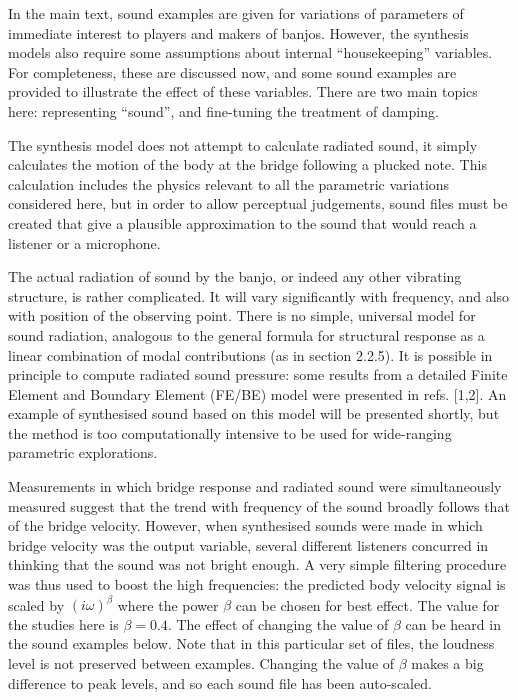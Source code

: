   In the main text, sound examples are given for variations of parameters of 
  immediate interest to players and makers of banjos. However, the synthesis 
  models also require some assumptions about internal ``housekeeping'' 
  variables. For completeness, these are discussed now, and some sound examples 
  are provided to illustrate the effect of these variables. There are two main 
  topics here: representing ``sound'', and fine-tuning the treatment of 
  damping. 

  The synthesis model does not attempt to calculate radiated sound, it simply 
  calculates the motion of the body at the bridge following a plucked note. 
  This calculation includes the physics relevant to all the parametric 
  variations considered here, but in order to allow perceptual judgements, 
  sound files must be created that give a plausible approximation to the sound 
  that would reach a listener or a microphone. 

  The actual radiation of sound by the banjo, or indeed any other vibrating 
  structure, is rather complicated. It will vary significantly with frequency, 
  and also with position of the observing point. There is no simple, universal 
  model for sound radiation, analogous to the general formula for structural 
  response as a linear combination of modal contributions (as in section 
  2.2.5). It is possible in principle to compute radiated sound pressure: some 
  results from a detailed Finite Element and Boundary Element (FE/BE) model 
  were presented in refs. [1,2]. An example of synthesised sound based on this 
  model will be presented shortly, but the method is too computationally 
  intensive to be used for wide-ranging parametric explorations. 

  Measurements in which bridge response and radiated sound were simultaneously 
  measured suggest that the trend with frequency of the sound broadly follows 
  that of the bridge velocity. However, when synthesised sounds were made in 
  which bridge velocity was the output variable, several different listeners 
  concurred in thinking that the sound was not bright enough. A very simple 
  filtering procedure was thus used to boost the high frequencies: the 
  predicted body velocity signal is scaled by $(i \omega)^\beta$ where the 
  power $\beta$ can be chosen for best effect. The value for the studies here 
  is $\beta=0.4$. The effect of changing the value of $\beta$ can be heard in 
  the sound examples below. Note that in this particular set of files, the 
  loudness level is not preserved between examples. Changing the value of 
  $\beta$ makes a big difference to peak levels, and so each sound file has 
  been auto-scaled. 

